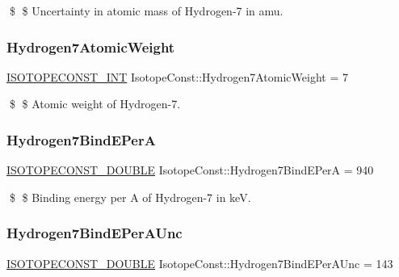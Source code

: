\$ \$ Uncertainty in atomic mass of Hydrogen-\/7 in amu. \mbox{\label{group___isotope_const-_hydrogen-_h7_ga6d2eb0a255e8a1b0ccf252af13e2f1ba}} 
\subsubsection{\texorpdfstring{Hydrogen7\+Atomic\+Weight}{Hydrogen7AtomicWeight}}
{\footnotesize\ttfamily \mbox{\hyperlink{group___isotope_const-_macros_ga5f18360b3e99483a35c32d789e62621c}{I\+S\+O\+T\+O\+P\+E\+C\+O\+N\+S\+T\+\_\+\+I\+NT}} Isotope\+Const\+::\+Hydrogen7\+Atomic\+Weight = 7}

\$ \$ Atomic weight of Hydrogen-\/7. \mbox{\label{group___isotope_const-_hydrogen-_h7_gacda7afc9b251e957b6bc5b98345dfb99}} 
\subsubsection{\texorpdfstring{Hydrogen7\+Bind\+E\+PerA}{Hydrogen7BindEPerA}}
{\footnotesize\ttfamily \mbox{\hyperlink{group___isotope_const-_macros_ga8f45a7272ce02c0b4c65c44636ed719a}{I\+S\+O\+T\+O\+P\+E\+C\+O\+N\+S\+T\+\_\+\+D\+O\+U\+B\+LE}} Isotope\+Const\+::\+Hydrogen7\+Bind\+E\+PerA = 940}

\$ \$ Binding energy per A of Hydrogen-\/7 in keV. \mbox{\label{group___isotope_const-_hydrogen-_h7_ga160ef922ae1ec0ddcc5cf6d6bf735d88}} 
\subsubsection{\texorpdfstring{Hydrogen7\+Bind\+E\+Per\+A\+Unc}{Hydrogen7BindEPerAUnc}}
{\footnotesize\ttfamily \mbox{\hyperlink{group___isotope_const-_macros_ga8f45a7272ce02c0b4c65c44636ed719a}{I\+S\+O\+T\+O\+P\+E\+C\+O\+N\+S\+T\+\_\+\+D\+O\+U\+B\+LE}} Isotope\+Const\+::\+Hydrogen7\+Bind\+E\+Per\+A\+Unc = 143}

